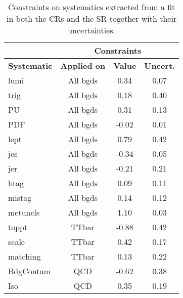 \documentclass[10pt]{article}
\begin{document}
\begin{table}[!ht]
\begin{center}
\begin{tabular}{|l|c|c|c|}
\hline
\hline
& \multicolumn{3}{c|}{\textbf{Constraints}} \\
\hline
\hline
\textbf{Systematic} & \textbf{Applied on} & \textbf{Value} & \textbf{Uncert.}\\
\hline
lumi            & All bgds  &  0.34   & 0.07   \\
trig            & All bgds  & 0.18    & 0.40   \\
PU              & All bgds  & 0.31    & 0.13   \\
PDF             & All bgds  & -0.02   & 0.01   \\
lept            & All bgds  & 0.79    & 0.42   \\
jes             & All bgds  & -0.34   & 0.05   \\
jer             & All bgds  & -0.21   & 0.21   \\
btag            & All bgds  &  0.09   & 0.11   \\
mistag          & All bgds  &  0.14   & 0.12   \\
metuncls        & All bgds  & 1.10    & 0.03   \\
toppt           & TTbar     & -0.88   & 0.42   \\
scale           & TTbar     & 0.42    & 0.17   \\
matching        & TTbar     & 0.13    & 0.22   \\
BdgContam       & QCD       & -0.62   & 0.38   \\
Iso             & QCD       &  0.35   & 0.19   \\
\hline
\hline

\hline
\hline
\end{tabular}
\caption{Constraints on systematics extracted from a fit in both the CRs and the SR together with their uncertainties.}
\label{tab:SFtable}
\end{center}
\end{table} 
\end{document}
